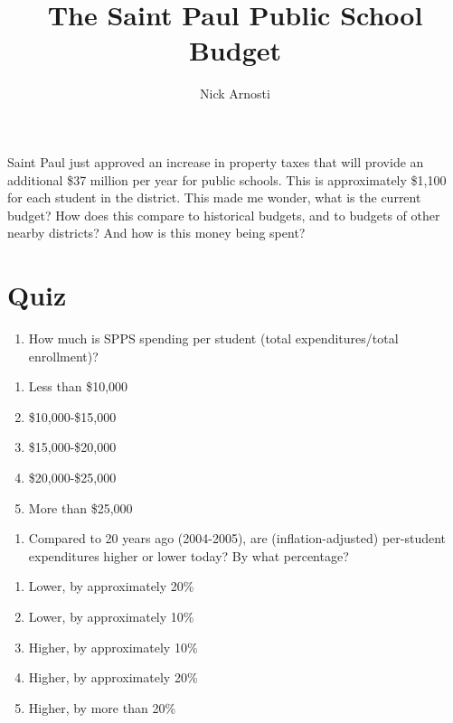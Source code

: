 \documentclass[
]{article}
\title{The Saint Paul Public School Budget}
\author{Nick Arnosti}
\date{}
\providecommand{\tightlist}{%
  \setlength{\itemsep}{0pt}\setlength{\parskip}{0pt}}
\begin{document}
\maketitle

Saint Paul just approved an increase in property taxes that will provide
an additional \$37 million per year for public schools. This is
approximately \$1,100 for each student in the district. This made me
wonder, what is the current budget? How does this compare to historical
budgets, and to budgets of other nearby districts? And how is this money
being spent?

\section{Quiz}\label{quiz}

\begin{enumerate}
\def\labelenumi{\arabic{enumi}.}
\tightlist
\item
  How much is SPPS spending per student (total expenditures/total
  enrollment)?
\end{enumerate}

\begin{enumerate}
\def\labelenumi{\alph{enumi})}
\tightlist
\item
  Less than \$10,000
\item
  \$10,000-\$15,000\\
\item
  \$15,000-\$20,000
\item
  \$20,000-\$25,000
\item
  More than \$25,000
\end{enumerate}

\begin{enumerate}
\def\labelenumi{\arabic{enumi}.}
\setcounter{enumi}{1}
\tightlist
\item
  Compared to 20 years ago (2004-2005), are (inflation-adjusted)
  per-student expenditures higher or lower today? By what percentage?
\end{enumerate}

\begin{enumerate}
\def\labelenumi{\alph{enumi})}
\tightlist
\item
  Lower, by approximately 20\%
\item
  Lower, by approximately 10\%\\
\item
  Higher, by approximately 10\%
\item
  Higher, by approximately 20\%
\item
  Higher, by more than 20\%
\end{enumerate}
\end{document}
